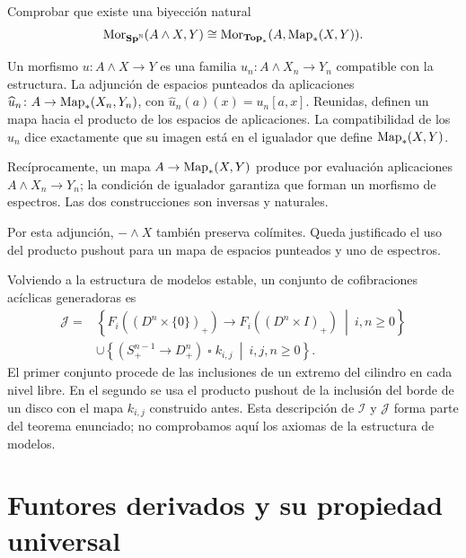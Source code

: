 \begin{ejer}\label{ejer:c13-adjuncion-smash}
Comprobar que existe una biyección natural
\[
\operatorname{Mor}_{\mathbf{Sp}^{\mathbb N}}(A\wedge X,Y)
\cong\operatorname{Mor}_{\mathbf{Top}_*}(A,\operatorname{Map}_*(X,Y)).
\]
\end{ejer}
\begin{sol}
Un morfismo $u\colon A\wedge X\to Y$ es una familia $u_n\colon A\wedge X_n\to Y_n$ compatible con la estructura. La adjunción de espacios punteados da aplicaciones $\widehat u_n\colon A\to\operatorname{Map}_*(X_n,Y_n)$, con $\widehat u_n(a)(x)=u_n[a,x]$. Reunidas, definen un mapa hacia el producto de los espacios de aplicaciones. La compatibilidad de los $u_n$ dice exactamente que su imagen está en el igualador que define $\operatorname{Map}_*(X,Y)$.

Recíprocamente, un mapa $A\to\operatorname{Map}_*(X,Y)$ produce por evaluación aplicaciones $A\wedge X_n\to Y_n$; la condición de igualador garantiza que forman un morfismo de espectros. Las dos construcciones son inversas y naturales.
\end{sol}

Por esta adjunción, $-\wedge X$ también preserva colímites. Queda justificado el uso del producto pushout para un mapa de espacios punteados y uno de espectros.

Volviendo a la estructura de modelos estable, un conjunto de cofibraciones acíclicas generadoras es
\[
\begin{aligned}
\mathcal J={}&\left\{
F_i((D^n\times\{0\})_+)\longrightarrow F_i((D^n\times I)_+)
\ \middle|\ i,n\ge0
\right\}\\
&\cup\left\{
(S^{n-1}_+\to D^n_+)\mathbin{\square}k_{i,j}
\ \middle|\ i,j,n\ge0
\right\}.
\end{aligned}
\]
El primer conjunto procede de las inclusiones de un extremo del cilindro en cada nivel libre. En el segundo se usa el producto pushout de la inclusión del borde de un disco con el mapa $k_{i,j}$ construido antes. Esta descripción de $\mathcal I$ y $\mathcal J$ forma parte del teorema enunciado; no comprobamos aquí los axiomas de la estructura de modelos.

\section{Funtores derivados y su propiedad universal}

